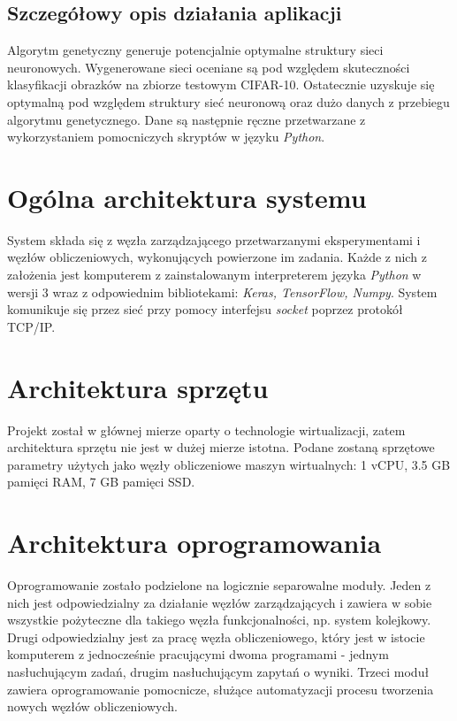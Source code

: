 \subsection{Szczegółowy opis działania aplikacji}
Algorytm genetyczny generuje potencjalnie optymalne struktury sieci neuronowych.
Wygenerowane sieci oceniane są pod względem skuteczności klasyfikacji obrazków na zbiorze testowym CIFAR-10.
Ostatecznie uzyskuje się optymalną pod względem struktury sieć neuronową oraz dużo danych z przebiegu algorytmu genetycznego.
Dane są następnie ręczne przetwarzane z wykorzystaniem pomocniczych skryptów w języku \textit{Python}.

\section{Ogólna architektura systemu}
System składa się z węzła zarządzającego przetwarzanymi eksperymentami i węzłów obliczeniowych, wykonujących powierzone im zadania.
Każde z nich z założenia jest komputerem z zainstalowanym interpreterem języka \textit{Python} w wersji 3 wraz z odpowiednim bibliotekami: \textit{Keras, TensorFlow, Numpy}.
System komunikuje się przez sieć przy pomocy interfejsu \textit{socket} poprzez protokół TCP/IP.

\section{Architektura sprzętu}

Projekt został w głównej mierze oparty o technologie wirtualizacji, zatem architektura sprzętu nie jest w dużej mierze istotna.
Podane zostaną sprzętowe parametry użytych jako węzły obliczeniowe maszyn wirtualnych: 1 vCPU, 3.5 GB pamięci RAM, 7 GB pamięci SSD.

\section{Architektura oprogramowania}
Oprogramowanie zostało podzielone na logicznie separowalne moduły.
Jeden z nich jest odpowiedzialny za działanie węzłów zarządzających i zawiera w sobie wszystkie pożyteczne dla takiego węzła funkcjonalności, np. system kolejkowy.
Drugi odpowiedzialny jest za pracę węzła obliczeniowego, który jest w istocie komputerem z jednocześnie pracującymi dwoma programami - jednym nasłuchującym zadań, drugim nasłuchującym zapytań o wyniki.
Trzeci moduł zawiera oprogramowanie pomocnicze, służące automatyzacji procesu tworzenia nowych węzłów obliczeniowych.

